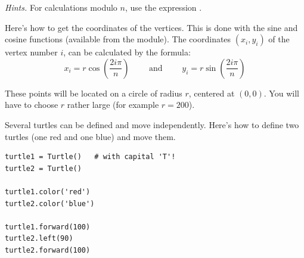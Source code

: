 \documentclass[11pt,class=report,crop=false]{standalone}
\begin{document}
\begin{activite}
\emph{Hints.} For calculations modulo $n$, use the expression .


Here's how to get the coordinates of the vertices. This is done with the sine and cosine functions (available from the  module).
The coordinates $(x_i,y_i)$ of the vertex number $i$, can be calculated by the formula:
$$x_i = r \cos\left(\frac{2 i \pi}{n}\right) \qquad \text{ and } \qquad y_i = r\sin\left(\frac{2 i \pi}{n}\right)$$

These points will be located on a circle of radius $r$, centered at $(0,0)$. 
You will have to choose $r$ rather large (for example $r=200$).



\end{activite}


\begin{cours}

Several turtles can be defined and move independently.
Here's how to define two turtles (one red and one blue) and move them.

\begin{lstlisting}
turtle1 = Turtle()   # with capital 'T'!
turtle2 = Turtle()

turtle1.color('red')
turtle2.color('blue')

turtle1.forward(100)
turtle2.left(90)
turtle2.forward(100)
\end{lstlisting}

\end{cours}


\end{document}
